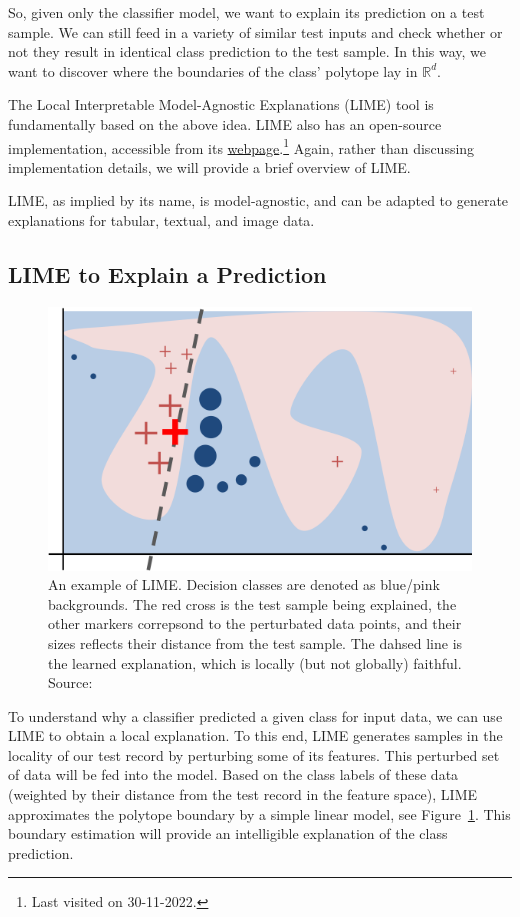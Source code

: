 \documentclass[output=paper,colorlinks,citecolor=brown
]{langscibook}
\begin{document}
So, given only the classifier model, we want to explain its prediction on a test sample. We can still feed in a variety of similar test inputs and check whether or not they result in identical class prediction to the test sample. In this way, we want to discover where the boundaries of the class' polytope lay in $\mathbb{R}^d$.

The Local Interpretable Model-Agnostic Explanations (LIME) \cite{lime} tool is fundamentally based on the above idea. LIME also has an open-source implementation, accessible from its \href{https://homes.cs.washington.edu/~marcotcr/blog/lime/}{webpage}.\footnote{Last visited on 30-11-2022.} Again, rather than discussing implementation details, we will provide a brief overview of LIME.

LIME, as implied by its name, is model-agnostic, and can be adapted to generate explanations for tabular, textual, and image data.

\subsection{LIME to Explain a Prediction}

\begin{figure}[h!]
    \includegraphics[width=.6\textwidth]{lime.png}
    \caption{An example of LIME. Decision classes are denoted as blue/pink backgrounds. The red cross is the test sample being explained, the other markers correpsond to the perturbated data points, and their sizes reflects their distance from the test sample. The dahsed line is the learned explanation, which is locally (but not globally) faithful. Source: \cite{lime}}
    \label{fig:lime}
\end{figure}

To understand why a classifier predicted a given class for input data, we can use LIME to obtain a local explanation. To this end, LIME generates samples in the locality of our test record by perturbing some of its features. This perturbed set of data will be fed into the model. Based on the class labels of these data (weighted by their distance from the test record in the feature space), LIME approximates the polytope boundary by a simple linear model, see Figure~\ref{fig:lime}. This boundary estimation will provide an intelligible explanation of the class prediction.
\end{document}
